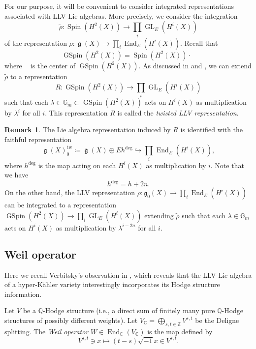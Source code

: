 \documentclass[12pt,reqno]{amsart}
\theoremstyle{definition}
\newtheorem{rem}[thm]{Remark}
\newcommand{\G}{{\mathds G}}
\newcommand{\Q}{{\mathds Q}}
\newcommand{\Z}{{\mathds Z}}
\newcommand{\C}{{\mathds C}}
\newcommand\End{\mathop{\mathrm{End}}\nolimits}
\newcommand\GL{\mathop{\mathrm{GL}}\nolimits}
\newcommand\Gm{\mathop{\mathbb{G}_\mathrm{m}}\nolimits}
\renewcommand\ge{\mathop{\mathfrak{g}}\nolimits}
\newcommand\Spin{\mathop{\mathrm{Spin}}\nolimits}
\newcommand\GSpin{\mathop{\mathrm{GSpin}}\nolimits}
\newcommand{\frg}{\mathfrak{g}}
\DeclareMathOperator{\tw}{tw}
\numberwithin{equation}{section}
\begin{document}
For our purpose, it will be convenient to consider integrated representations
associated with LLV Lie algebras.
More precisely, we consider
the integration
\[
\widetilde{\rho} \colon \Spin(H^2(X)) \to \prod_i\GL_E(H^i(X))
\]
of the representation $\rho \colon \overline{\ge}(X) \to \prod_i\End_E(H^i(X))$.
Recall that 
\[
\GSpin(H^2(X)) = \Spin(H^2(X)) \cdot \Gm
\]
where $\Gm$ is the center of $\GSpin(H^2(X))$.
As discussed in
\cite[Section 6.2]{FFZ}
and
\cite[Section 2.1]{Floccarigalois},
we can extend $\widetilde{\rho}$ to a representation
\begin{equation}\label{Equation:twisted LLV representation}
    R \colon \GSpin(H^2(X)) \to \prod_i\GL_E(H^i(X))
\end{equation}
such that each $\lambda \in \G_m \subset \GSpin(H^2(X))$
acts on $H^i(X)$ as multiplication by $\lambda^i$ for all $i$.
This representation $R$ is called the
\textit{twisted LLV representation}.


\begin{rem}\label{Remark:twsited LLV representation and twisted degree operator}
The Lie algebra representation induced by $R$ is identified with the faithful representation
\begin{equation}\label{Equation:twisted g_0}
    \ge(X)^{\tw}_0 \coloneqq  \overline{\ge}(X) \oplus Eh^{\deg} \hookrightarrow \prod_i\End_E(H^i(X)),
\end{equation}
where $h^{\deg}$ is the map acting on each $H^i(X)$ as multiplication by $i$.
Note that we have
\[
h^{\deg}=h+2n.
\]
On the other hand, the LLV representation
$
\rho \colon \frg_0(X) \to \prod_i \End_E(H^i(X))
$
can be integrated to a representation
$
\GSpin(H^2(X)) \to \prod_i \GL_E(H^i(X))
$
extending 
$\widetilde{\rho}$
such that 
each $\lambda \in \G_m$ acts on $H^i(X)$ as multiplication by $\lambda^{i-2n}$ for all $i$.
\end{rem}



\subsection{Weil operator}
Here we recall Verbitsky's observation in {\cite{Verbitskyaction}}, which reveals that the LLV Lie algebra of a hyper-Kähler variety interestingly incorporates its Hodge structure information.


    Let $V$ be a
    $\Q$-Hodge structure
    (i.e., a direct sum of finitely many pure $\Q$-Hodge structures of 
possibly different weights).
    Let
    $
    V_{\C} = \bigoplus_{s,t \in \Z} V^{s,t}
    $
    be the Deligne splitting.
    The \textit{Weil operator} $W \in \End_\C (V_{\C})$ is the map defined by
    \[
    V^{s,t} \ni x \mapsto (t-s) \sqrt{-1} x \in  V^{s,t}.
    \]
\end{document}
